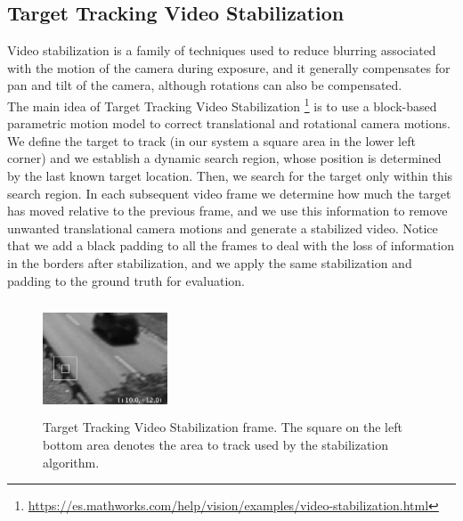 \subsection{Target Tracking Video Stabilization}
\label{sec:stabilization}
Video stabilization is a family of techniques used to reduce blurring associated with the motion of the camera  during exposure, and it generally compensates for pan and tilt of the camera, although rotations can also be compensated.\\

\noindent The main idea of Target Tracking Video Stabilization \footnote{\url{https://es.mathworks.com/help/vision/examples/video-stabilization.html}} is to use a block-based parametric motion model to correct translational and rotational camera motions. We define the target to track (in our system a square area in the lower left corner) and we establish a dynamic search region, whose position is determined by the last known target location. Then, we search for the target only within this search region. In each subsequent video frame we determine how much the target has moved relative to the previous frame, and we use this information to remove unwanted translational camera motions and generate a stabilized video. Notice that we add a black padding to all the frames to deal with the loss of information in the borders after stabilization, and we apply the same stabilization and padding to the ground truth for evaluation.

\begin{figure}[h]
\centering
\includegraphics[width=105pt, height=95pt]{figures/target_tracking.png} 
\caption{Target Tracking Video Stabilization frame. The square on the left bottom area denotes the area to track used by the stabilization algorithm.}
\label{fig:fg}
\end{figure}